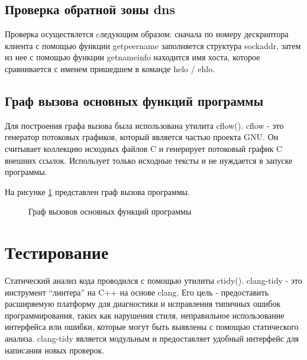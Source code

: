 \documentclass[a4paper,12pt]{report}
\begin{document}
\subsection{Проверка обратной зоны dns}

Проверка осуществлется cледующим образом: сначала по номеру  дескриптора клиента с помощью функции getpeername заполняется структура sockaddr, затем из нее с помощью функции getnameinfo находится имя хоста, которое сравнивается с именем пришедшем в команде helo / ehlo.

\subsection{Граф вызова основных функций программы}

Для построения графа вызова была использована утилита cflow(\cite{cflow}). cflow - это генератор потоковых графиков, который является частью проекта GNU. Он считывает коллекцию исходных файлов C и генерирует потоковый график C внешних ссылок. Использует только исходные тексты и не нуждается в запуске программы.

На рисунке \ref{ris:calls} представлен граф вызова программы.

\begin{figure}[h!]
\caption{Граф вызовов основных функций программы}
\label{ris:calls}
\end{figure}

\newpage


\section{Тестирование}
Статический анализ кода проводился с помощью утилиты ctidy(\cite{ctidy}). clang-tidy - это инструмент “линтера” на C++ на основе clang. Его цель - предоставить расширяемую платформу для диагностики и исправления типичных ошибок программирования, таких как нарушения стиля, неправильное использование интерфейса или ошибки, которые могут быть выявлены с помощью статического анализа. clang-tidy является модульным и предоставляет удобный интерфейс для написания новых проверок.
\end{document}
